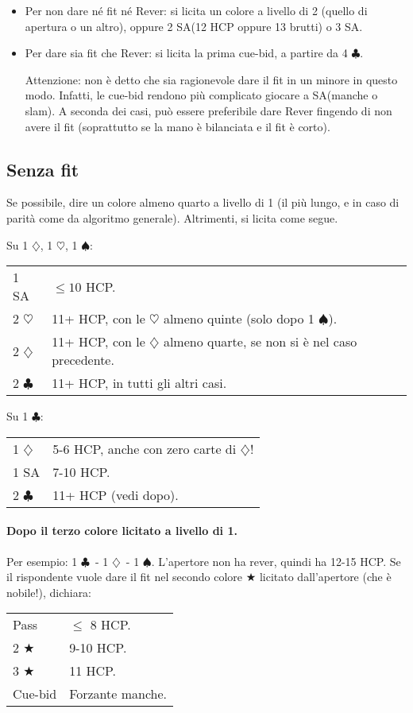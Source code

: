 \documentclass[a4paper,10pt]{article}
\renewcommand{\c}{$\clubsuit$\xspace}
\renewcommand{\d}{$\diamondsuit$\xspace}
\newcommand{\h}{$\heartsuit$\xspace}
\newcommand{\s}{$\spadesuit$\xspace}
\renewcommand{\j}{$\bigstar$\xspace}
\newcommand{\sa}{SA\xspace}
\newcommand{\smallspace}{\vskip0.3cm}
\newenvironment{twocol}
  {\smallspace\noindent\begin{tabular}{l p{0.78\textwidth}}}
  {\end{tabular}\smallspace}
\begin{document}
\begin{itemize}
\begin{itemize}
  \item Per non dare né fit né Rever: si licita un colore a livello di 2 (quello di apertura o un altro), oppure 2 \sa (12 HCP oppure 13 brutti) o 3 \sa.
  
  \item Per dare sia fit che Rever: si licita la prima cue-bid, a partire da 4 \c.
  
  Attenzione: non è detto che sia ragionevole dare il fit in un minore in questo modo. Infatti, le cue-bid rendono più complicato giocare a \sa (manche o slam). A seconda dei casi, può essere preferibile dare Rever fingendo di non avere il fit (soprattutto se la mano è bilanciata e il fit è corto).
 \end{itemize}

\end{itemize}


\subsection{Senza fit}

Se possibile, dire un colore almeno quarto a livello di 1 (il più lungo, e in caso di parità come da algoritmo generale). Altrimenti, si licita come segue.

Su 1 \d, 1 \h, 1 \s:
\begin{twocol}
	1 \sa & $\leq 10$ HCP.\\
	2 \h & 11+ HCP, con le \h almeno quinte (solo dopo 1 \s).\\
	2 \d & 11+ HCP, con le \d almeno quarte, se non si è nel caso precedente.\\
	2 \c & 11+ HCP, in tutti gli altri casi.\\
\end{twocol}

Su 1 \c:
\begin{twocol}
	1 \d & 5-6 HCP, anche con zero carte di \d! \\
	1 \sa & 7-10 HCP. \\
	2 \c & 11+ HCP (vedi dopo). \\
\end{twocol}

\paragraph{Dopo il terzo colore licitato a livello di 1.} Per esempio: 1 \c\ - 1 \d\ - 1 \s.
L'apertore non ha rever, quindi ha 12-15 HCP.
Se il rispondente vuole dare il fit nel secondo colore \j licitato dall'apertore (che è nobile!), dichiara:
\begin{twocol}
	Pass & $\leq$ 8 HCP.\\
	2 \j  & 9-10 HCP.\\
	3 \j & 11 HCP.\\
	Cue-bid  & Forzante manche.\\
\end{twocol}
\end{document}
